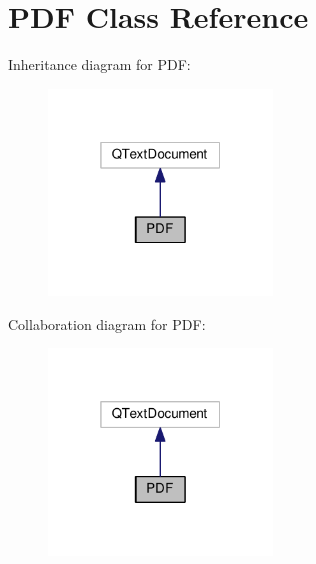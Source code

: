 \hypertarget{class_p_d_f}{}\section{P\+DF Class Reference}
\label{class_p_d_f}


Inheritance diagram for P\+DF\+:\nopagebreak
\begin{figure}[H]
\begin{center}
\leavevmode
\includegraphics[width=169pt]{class_p_d_f__inherit__graph}
\end{center}
\end{figure}


Collaboration diagram for P\+DF\+:\nopagebreak
\begin{figure}[H]
\begin{center}
\leavevmode
\includegraphics[width=169pt]{class_p_d_f__coll__graph}
\end{center}
\end{figure}
